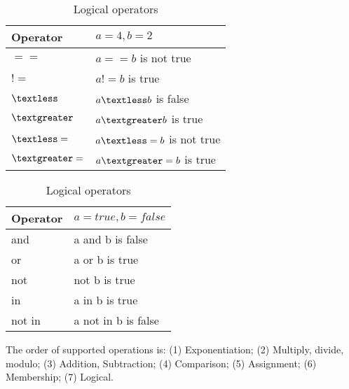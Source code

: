 \begin{table}[h]
\begin{center}
    \parbox{.4\linewidth}{
        \begin{tabular}{| l | l |}
        \hline
        Operator & $a=4, b=2$ \\ \hline
        $==$ & $a == b$ is not true \\ \hline
        $!=$ & $a != b$ is true \\ \hline
        $\textless$  & $a \textless b$ is false \\ \hline
        $\textgreater$  & $a \textgreater b$ is true \\ \hline
        $\textless=$ & $a \textless= b$ is not true \\ \hline
        $\textgreater=$ & $a \textgreater= b$ is true \\ \hline
        \end{tabular}
        \caption{Comparison operators.}
    }
    \parbox{.4\linewidth}{
        \begin{tabular}{| l | l |}
        \hline
        Operator & $a = true, b = false$ \\ \hline
        and & a and b is false \\ \hline
        or & a or b is true\\ \hline
        not & not b is true \\ \hline
        in & a in b is true \\ \hline
        not in & a not in b is false\\ \hline
        \end{tabular}
        \caption{Logical operators}
     }
\end{center}
\end{table}

The order of supported operations 
is: (1) Exponentiation; (2) Multiply, divide, modulo; (3) Addition, Subtraction; 
(4) Comparison; (5) Assignment; (6) Membership; (7) Logical.


